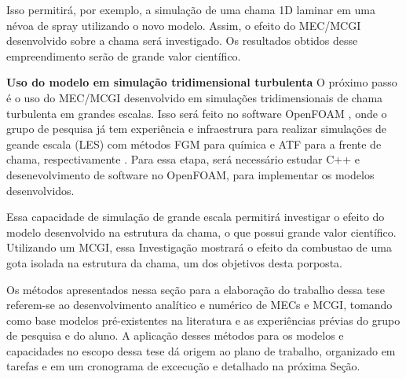 Isso permitirá, por exemplo, a simulação de uma chama 1D laminar em uma névoa de spray utilizando o novo modelo.
Assim, o efeito do MEC/MCGI desenvolvido sobre a chama será investigado.
Os resultados obtidos desse empreendimento serão de grande valor científico. 


\textbf{Uso do modelo em simulação tridimensional turbulenta}
O próximo passo é o uso do MEC/MCGI desenvolvido em simulações tridimensionais de chama turbulenta em grandes escalas.
Isso será feito no software OpenFOAM \source{}, onde o grupo de pesquisa já tem experiência e infraestrura para realizar simulações de geande escala (LES) com métodos FGM para química e ATF para a frente de chama, respectivamente \cite{SacomanoF2017PhD,SacomanoF2017CF,SacomanoF2020CF}.
Para essa etapa, será necessário estudar C++ e desenevolvimento de software no OpenFOAM, para implementar os modelos desenvolvidos.

Essa capacidade de simulação de grande escala permitirá investigar o efeito do modelo desenvolvido na estrutura da chama, o que possui grande valor científico.
Utilizando um MCGI, essa Investigação mostrará o efeito da combustao de uma gota isolada na estrutura da chama, um dos objetivos desta porposta.

Os métodos apresentados nessa seção para a elaboração do trabalho dessa tese referem-se ao desenvolvimento analítico e numérico de MECs e MCGI, tomando como base modelos pré-existentes na literatura e as experiências prévias do grupo de pesquisa e do aluno.
A aplicação desses métodos para os modelos e capacidades no escopo dessa tese dá origem ao plano de trabalho, organizado em tarefas e em um cronograma de excecução e detalhado na próxima Seção.


